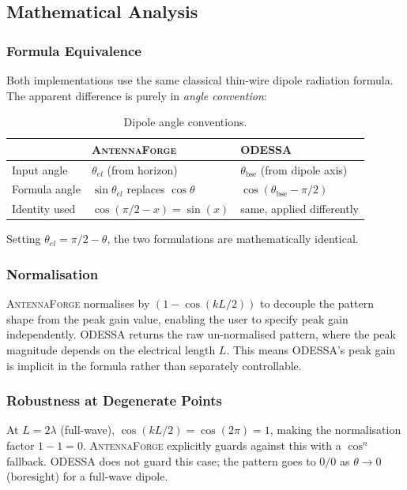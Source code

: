 \documentclass[11pt,a4paper]{article}
\newcommand{\AF}{\textsc{AntennaForge}}
\newcommand{\OD}{\textsc{ODESSA}}
\begin{document}
\subsection{Mathematical Analysis}

\subsubsection{Formula Equivalence}

Both implementations use the same classical thin-wire dipole radiation formula.
The apparent difference is purely in \emph{angle convention}:

\begin{table}[H]
\centering
\caption{Dipole angle conventions.}
\small
\begin{tabularx}{\textwidth}{l X X}
\toprule
 & \textbf{\AF{}} & \textbf{\OD{}} \\
\midrule
Input angle & $\theta_{el}$ (from horizon) & $\theta_\text{bse}$ (from dipole axis) \\
Formula angle & $\sin\theta_{el}$ replaces $\cos\theta$ & $\cos(\theta_\text{bse} - \pi/2)$ \\
Identity used & $\cos(\pi/2 - x) = \sin(x)$ & same, applied differently \\
\bottomrule
\end{tabularx}
\end{table}

Setting $\theta_{el} = \pi/2 - \theta$, the two formulations are mathematically
identical.

\subsubsection{Normalisation}

\AF{} normalises by $(1 - \cos(kL/2))$ to decouple the pattern shape from the
peak gain value, enabling the user to specify peak gain independently.  \OD{}
returns the raw un-normalised pattern, where the peak magnitude depends on the
electrical length $L$.  This means \OD{}'s peak gain is implicit in the formula
rather than separately controllable.

\subsubsection{Robustness at Degenerate Points}

At $L = 2\lambda$ (full-wave), $\cos(kL/2) = \cos(2\pi) = 1$, making the
normalisation factor $1 - 1 = 0$.  \AF{} explicitly guards against this with a
$\cos^n$ fallback.  \OD{} does not guard this case; the pattern goes to
$0/0$ as $\theta \to 0$ (boresight) for a full-wave dipole.
\end{document}
